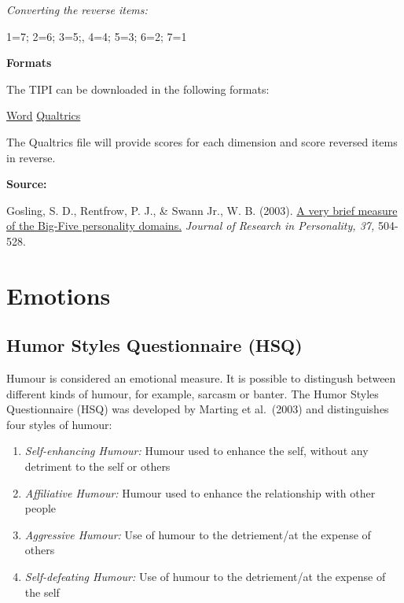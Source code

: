 \documentclass[
]{book}
\providecommand{\tightlist}{%
  \setlength{\itemsep}{0pt}\setlength{\parskip}{0pt}}
\begin{document}
\emph{Converting the reverse items:}

1=7; 2=6; 3=5;, 4=4; 5=3; 6=2; 7=1

\textbf{Formats}

The TIPI can be downloaded in the following formats:

\href{questionnaires/10-ItemPersonalityInventory_TIPI.docx}{Word} \textbar{} \href{questionnaires/10-ItemPersonalityInventory_TIPI.qsf}{Qualtrics}

The Qualtrics file will provide scores for each dimension and score reversed items in reverse.

\textbf{Source:}

Gosling, S. D., Rentfrow, P. J., \& Swann Jr., W. B. (2003). \href{http://citeseerx.ist.psu.edu/viewdoc/download?doi=10.1.1.113.6704\&rep=rep1\&type=pdf}{A very brief measure of the Big-Five personality domains.} \emph{Journal of Research in Personality, 37,} 504-528.

\hypertarget{emotions}{%
\section{Emotions}\label{emotions}}

\hypertarget{humor-styles-questionnaire-hsq}{%
\subsection{Humor Styles Questionnaire (HSQ)}\label{humor-styles-questionnaire-hsq}}

Humour is considered an emotional measure. It is possible to distingush between different kinds of humour, for example, sarcasm or banter. The Humor Styles Questionnaire (HSQ) was developed by Marting et al.~(2003) and distinguishes four styles of humour:

\begin{enumerate}
\def\labelenumi{\arabic{enumi}.}
\tightlist
\item
  \emph{Self-enhancing Humour:} Humour used to enhance the self, without any detriment to the self or others
\item
  \emph{Affiliative Humour:} Humour used to enhance the relationship with other people
\item
  \emph{Aggressive Humour:} Use of humour to the detriement/at the expense of others
\item
  \emph{Self-defeating Humour:} Use of humour to the detriement/at the expense of the self
\end{enumerate}
\end{document}
